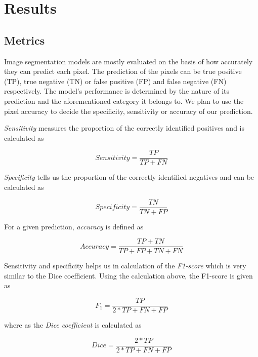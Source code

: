 \section{Results}

\subsection{Metrics}

Image segmentation models are mostly evaluated on the basis of how accurately they can predict each pixel. The prediction of the pixels can be true positive (TP), true negative (TN) or false positive (FP) and false negative (FN) respectively. The model’s performance is determined by the nature of its prediction and the aforementioned category it belongs to. We plan to use the pixel accuracy to decide the specificity, sensitivity or accuracy of our prediction.

\par
\emph{Sensitivity} measures the proportion of the correctly identified positives and is calculated as

\begin{equation}
  Sensitivity = \frac{TP}{TP + FN}
\end{equation}

\emph{Specificity} tells us the proportion of the correctly identified negatives and can be calculated as

\begin{equation}
  Specificity = \frac{TN}{TN + FP}
\end{equation}

For a given prediction, \emph{accuracy} is defined as

\begin{equation}
  Accuracy = \frac{TP + TN}{TP + FP + TN + FN}
\end{equation}

Sensitivity and specificity helps us in calculation of the \emph{F1-score} which is very similar to the Dice coefficient. Using the calculation above, the F1-score is given as

\begin{equation}
  F_1 = \frac{TP}{2 * TP + FN + FP}
\end{equation}

where as the \emph{Dice coefficient} is calculated as

\begin{equation}
  Dice = \frac{2 * TP}{2 * TP + FN + FP}
\end{equation}

